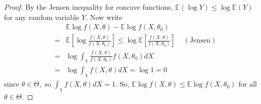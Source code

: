 \documentclass[notes=show]{beamer}
\begin{document}
\begin{frame}%


\begin{proof}
By the Jensen inequality for concave functions, $\mathbb{E}\left( \log
Y\right) \leq \log \mathbb{E}\left( Y\right) $ for any random variable $Y$.
Now write%
\begin{eqnarray*}
&&\mathbb{E}\log f\left( X,\theta \right) -\mathbb{E}\log f\left( X,\theta
_{0}\right) \\
&=&\mathbb{E}\left[ \log \frac{f\left( X,\theta \right) }{f\left( X,\theta
_{0}\right) }\right] \leq \log \mathbb{E}\left[ \frac{f\left( X,\theta
\right) }{f\left( X,\theta _{0}\right) }\right] \;\;\;\;\left( \text{Jensen}%
\right) \\
&=&\log \int_{\chi }\frac{f\left( X,\theta \right) }{f\left( X,\theta
_{0}\right) }f\left( X,\theta _{0}\right) dX \\
&=&\log \int_{\chi }f\left( X,\theta \right) dX=\log 1=0
\end{eqnarray*}%
since $\theta \in \Theta ,$ so $\int_{\chi }f\left( X,\theta \right) dX=1$.
So, $\mathbb{E}\log f\left( X,\theta \right) \leq \mathbb{E}\log f\left(
X,\theta _{0}\right) $ for all $\theta \in \Theta .$
\end{proof}

\end{frame}%
\end{document}
